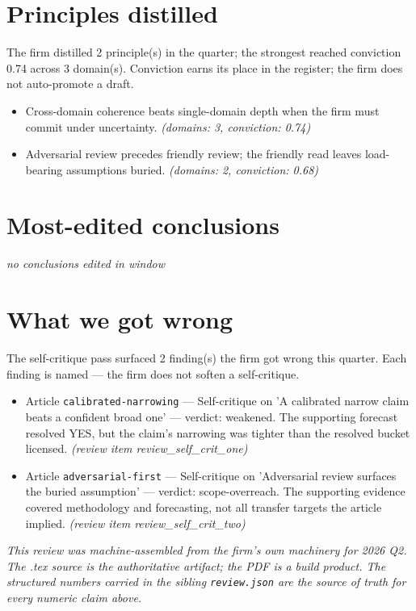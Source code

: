 \documentclass[11pt,letterpaper]{article}
\newcommand{\datagap}[1]{\textcolor{black!55}{\emph{#1}}}
\begin{document}
\section{Principles distilled}
The firm distilled 2 principle(s) in the quarter; the strongest reached conviction 0.74 across 3 domain(s). Conviction earns its place in the register; the firm does not auto-promote a draft.
\begin{itemize}[leftmargin=1.5em]
  \item Cross-domain coherence beats single-domain depth when the firm must commit under uncertainty. \emph{(domains: 3, conviction: 0.74)}
  \item Adversarial review precedes friendly review; the friendly read leaves load-bearing assumptions buried. \emph{(domains: 2, conviction: 0.68)}
\end{itemize}
\section{Most-edited conclusions}
\datagap{no conclusions edited in window}
\section{What we got wrong}
The self-critique pass surfaced 2 finding(s) the firm got wrong this quarter. Each finding is named — the firm does not soften a self-critique.
\begin{itemize}[leftmargin=1.5em]
  \item Article \texttt{calibrated-narrowing} --- Self-critique on 'A calibrated narrow claim beats a confident broad one' — verdict: weakened. The supporting forecast resolved YES, but the claim's narrowing was tighter than the resolved bucket licensed.
        \emph{(review item review\_self\_crit\_one)}
  \item Article \texttt{adversarial-first} --- Self-critique on 'Adversarial review surfaces the buried assumption' — verdict: scope-overreach. The supporting evidence covered methodology and forecasting, not all transfer targets the article implied.
        \emph{(review item review\_self\_crit\_two)}
\end{itemize}
\vfill
\begin{center}\small
\textit{This review was machine-assembled from the firm's own machinery
for 2026 Q2. The .tex source is the authoritative
artifact; the PDF is a build product. The structured numbers carried in
the sibling \texttt{review.json} are the source of truth for every
numeric claim above.}
\end{center}
\end{document}
